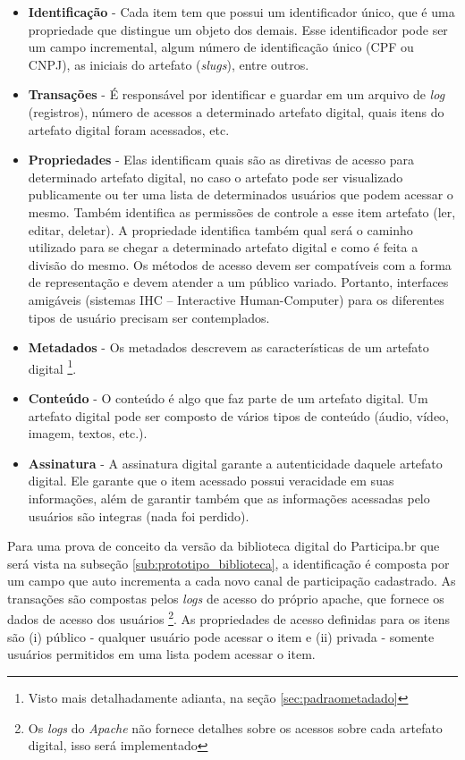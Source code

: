 \begin{itemize}
	\item \textbf{Identificação} - Cada item tem que possui um identificador único, que é uma propriedade que distingue um objeto dos demais. Esse identificador pode ser um campo incremental, algum número de identificação único (CPF ou CNPJ), as iniciais do artefato (\textit{slugs}), entre outros.	
	\item \textbf{Transações} - É responsável por identificar e guardar em um arquivo de \textit{log} (registros), número de acessos a determinado artefato digital, quais itens do artefato digital foram acessados, etc.	
	\item \textbf{Propriedades} - Elas identificam quais são as diretivas de acesso para determinado artefato digital, no caso o artefato pode ser visualizado publicamente ou ter uma lista de determinados usuários que podem acessar o mesmo. Também identifica as  permissões de controle a esse item artefato (ler, editar, deletar). A propriedade identifica também qual será o caminho utilizado para se chegar a determinado artefato digital e como é feita a divisão do mesmo. Os métodos de acesso devem ser compatíveis com a forma de representação e devem atender a um público variado. Portanto, interfaces amigáveis (sistemas IHC – Interactive Human-Computer) para os diferentes tipos de usuário precisam ser contemplados.
	\item \textbf{Metadados} - Os metadados descrevem as características de um artefato digital \footnote{Visto mais detalhadamente adianta, na seção \ref{sec:padraometadado}}.	
	\item \textbf{Conteúdo} - O conteúdo é algo que faz parte de um artefato digital. Um artefato digital pode ser composto de vários tipos de conteúdo (áudio, vídeo, imagem, textos, etc.). 	
	\item \textbf{Assinatura} - A assinatura digital garante a autenticidade daquele artefato digital. Ele garante que o item acessado possui veracidade em suas informações, além de garantir também que as informações acessadas pelo usuários são integras (nada foi perdido).
\end{itemize}

Para uma prova de conceito da versão da biblioteca digital do Participa.br que será vista na subseção \ref{sub:prototipo_biblioteca}, a identificação é composta por um campo que auto incrementa a cada novo canal de participação cadastrado. As transações são compostas pelos \textit{logs} de acesso do próprio apache, que fornece os dados de acesso dos usuários \footnote{Os \textit{logs} do \textit{Apache} não fornece detalhes sobre os acessos sobre cada artefato digital, isso será implementado}. As propriedades de acesso definidas para os itens são (i) público - qualquer usuário pode acessar o item e (ii) privada - somente usuários permitidos em uma lista podem acessar o item.

